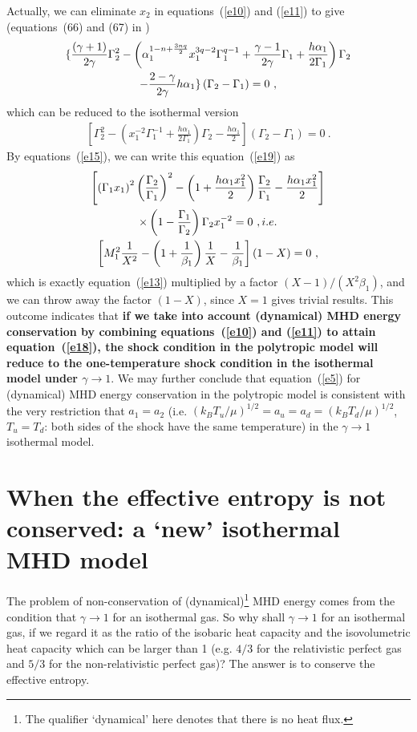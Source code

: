 \documentclass[fleqn,usenatbib]{mnras}
\begin{document}
Actually, we can eliminate $x_{2}$ in equations~(\ref{e10}) and (\ref{e11}) to give (equations~(66) and (67) in \citet{wang2008dynamic})
\begin{gather}
\lbrace \frac{(\gamma+1)}{2\gamma}\Gamma_{2}^{2}-\left(\alpha_{1}^{1-n+\frac{3nq}{2}}x_{1}^{3q-2}\Gamma_{1}^{q-1}+\frac{\gamma-1}{2\gamma}\Gamma_{1}+\frac{h\alpha_{1}}{2\Gamma_{1}}\right)\Gamma_{2}\notag\\
-\frac{2-\gamma}{2\gamma}h\alpha_{1}\rbrace \left(\Gamma_{2}-\Gamma_{1}\right)=0\ ,\label{e18}
\end{gather}
which can be reduced to the isothermal version
\begin{gather}
\left[\Gamma_{2}^{2}-\left(x_{1}^{-2}\Gamma_{1}^{-1}+\frac{h\alpha_{1}}{2\Gamma_{1}}\right)\Gamma_{2}-\frac{h\alpha_{1}}{2}\right]\left(\Gamma_{2}-\Gamma_{1}\right)=0\ .\label{e19}
\end{gather}
By equations~(\ref{e15}), we can write this equation~(\ref{e19}) as
\begin{gather}
\left[\left(\Gamma_{1}x_{1}\right)^{2}\left(\frac{\Gamma_{2}}{\Gamma_{1}}\right)^{2}-\left(1+\frac{h\alpha_{1}x_{1}^{2}}{2}\right)\frac{\Gamma_{2}}{\Gamma_{1}}-\frac{h\alpha_{1}x_{1}^{2}}{2}\right]\notag\\
\times \left(1-\frac{\Gamma_{1}}{\Gamma_{2}}\right)\Gamma_{2}x_{1}^{-2}=0\ , i.e.\notag\\
\left[M_{1}^{2}\frac{1}{X^{2}}-\left(1+\frac{1}{\beta_{1}}\right)\frac{1}{X}-\frac{1}{\beta_{1}}\right](1-X)=0\ ,\label{e20}
\end{gather}
which is exactly equation~(\ref{e13}) multiplied by a factor $(X-1)/\left(X^{2}\beta_{1}\right)$, and we can throw away the factor $\left(1-X\right)$, since $X=1$ gives trivial results. This outcome indicates that \textbf{if we take into account (dynamical) MHD energy conservation by combining equations~(\ref{e10}) and (\ref{e11}) to attain equation~(\ref{e18}), the shock condition in the polytropic model will reduce to the one-temperature shock condition in the isothermal model under $\gamma\rightarrow 1$}. We may further conclude that equation~(\ref{e5}) for (dynamical) MHD energy conservation in the polytropic model is consistent with the very restriction that $a_{1}=a_{2}$ (i.e. $\left(k_{B}T_{u}/\mu\right)^{1/2}=a_{u}=a_{d}=\left(k_{B}T_{d}/\mu\right)^{1/2}$, $T_{u}=T_{d}$: both sides of the shock have the same temperature) in the $\gamma\rightarrow 1$ isothermal model. 

\section{When the effective entropy is not conserved: a `new' isothermal MHD model}
The problem of non-conservation of (dynamical)\footnote{The qualifier `dynamical' here denotes that there is no heat flux.} MHD energy comes from the condition that $\gamma\rightarrow 1$ for an isothermal gas. So why shall $\gamma\rightarrow 1$ for an isothermal gas, if we regard it as the ratio of the isobaric heat capacity and the isovolumetric heat capacity which can be larger than 1 (e.g. $4/3$ for the relativistic perfect gas and $5/3$ for the non-relativistic perfect gas)? The answer is to conserve the effective entropy. 
\end{document}
